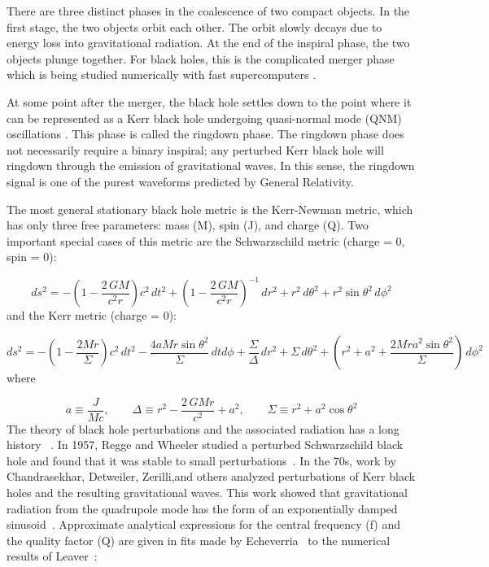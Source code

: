 There are three distinct phases in the coalescence of two compact objects. In the
first stage, the two objects orbit each other. The orbit slowly decays due to
energy loss into gravitational radiation. At the end of the inspiral phase, the
two objects plunge together. For black holes, this is the complicated merger
phase which is being studied numerically with fast supercomputers \cite{Mergers}.

At some point after the merger, the black hole settles down to the point where
it can be represented as a Kerr\cite{Kerr:BH} black hole undergoing
quasi-normal mode (QNM) oscillations \cite{Scott:RD}. This phase is called the ringdown
phase. The ringdown phase does not necessarily require a binary inspiral; any
perturbed Kerr black hole will ringdown through the emission of gravitational
waves. In this sense, the ringdown signal is one of the purest waveforms predicted
by General Relativity.

The most general stationary black hole metric is the 
Kerr-Newman metric\cite{BHWDNS}, which has only three free parameters: mass (M),
spin (J), and charge (Q). Two important special cases of this metric are
the Schwarzschild metric (charge = 0, spin = 0):

\begin{equation}
ds^2 = -\left(1 - \frac{2 \, G M}{c^2 r}\right) c^2 \, dt^2 
      + \left(1 - \frac{2 \, G M}{c^2 r}\right)^{-1} \, dr^2
      + r^2 \, d\theta^2 
      + r^2 \sin{\theta}^2 \, d\phi^2
\label{eq:Schwarz}
\end{equation}
and the Kerr metric (charge = 0):

\begin{equation}
ds^2 = -\left(1 - \frac{2 M r}{\Sigma}\right) c^2 \, dt^2 
       -\frac{4 a M r \sin{\theta}^2}{\Sigma} \, dt d\phi
       + \frac{\Sigma}{\Delta} \, dr^2
       + \Sigma \, d\theta^2 
       + \left(r^2 + a^2 + \frac{2 M r a^2 \sin{\theta}^2}{\Sigma} \right) \, d\phi^2
\label{eq:Kerr}
\end{equation}
where

\begin{equation}
a \equiv \frac{J}{M c}, \qquad  \Delta \equiv r^2 -\frac{2 \, G M r}{c^2} + a^2, 
\qquad \Sigma \equiv r^2 + a^2 \cos{\theta}^2  
\label{eq:subKerr}
\end{equation}
The theory of black hole perturbations and the associated radiation has a long history
~\cite{LivingReview:Ring}.
In 1957, Regge and Wheeler studied a perturbed Schwarzschild black hole
and found that it was stable to small perturbations~\cite{RW:RD}. In the 70s,
work by Chandrasekhar, Detweiler, Zerilli,and others analyzed perturbations of
Kerr black holes and the resulting gravitational waves. This work
showed that gravitational radiation from the quadrupole mode has the form of 
an exponentially damped sinusoid~\cite{Chandra:RD}. Approximate analytical 
expressions for
the central frequency (f) and the  quality factor (Q) are given 
in fits made by Echeverria~\cite{Echeverria:RD} to the numerical 
results of Leaver~\cite{Leaver:RD}:

